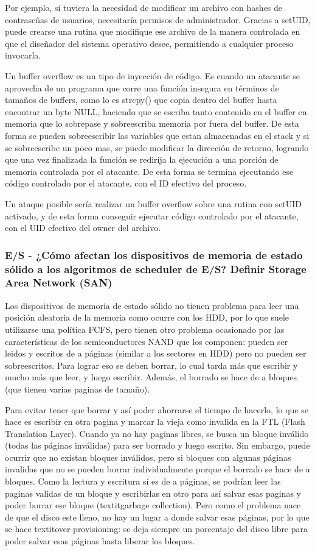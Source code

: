 Por ejemplo, si tuviera la necesidad de modificar un archivo con hashes de contraseñas de usuarios, necesitaría permisos de administrador. Gracias a setUID, puede crearse una rutina que modifique ese archivo de la manera controlada en que el diseñador del sistema operativo desee, permitiendo a cualquier proceso invocarla.

Un buffer overflow es un tipo de inyección de código. Es cuando un atacante se aprovecha de un programa que corre una función insegura en términos de tamaños de buffers, como lo es strcpy() que copia dentro del buffer hasta encontrar un byte NULL, haciendo que se escriba tanto contenido en el buffer en memoria que lo sobrepase y sobreescriba memoria por fuera del buffer. De esta forma se pueden sobreescribir las variables que estan almacenadas en el stack y si se sobreescribe un poco mas, se puede modificar la dirección de retorno, logrando que una vez finalizada la función se redirija la ejecución a una porción de memoria controlada por el atacante. De esta forma se termina ejecutando ese código controlado por el atacante, con el ID efectivo del proceso.

Un ataque posible sería realizar un buffer overflow sobre una rutina con setUID activado, y de esta forma conseguir ejecutar código controlado por el atacante, con el UID efectivo del owner del archivo.

\subsubsection{E/S - ¿Cómo afectan los dispositivos de memoria de estado sólido a los algoritmos de scheduler de E/S? Definir Storage Area Network (SAN)}

Los dispositivos de memoria de estado sólido no tienen problema para leer una posición aleatoria de la memoria como ocurre con los HDD, por lo que suele utilizarse una política FCFS, pero tienen otro problema ocasionado por las características de los semiconductores NAND que los componen: pueden ser leidos y escritos de a páginas (similar a los sectores en HDD) pero no pueden ser sobreescritos. Para lograr eso se deben borrar, lo cual tarda más que escribir y mucho más que leer, y luego escribir. Además, el borrado se hace de a bloques (que tienen varias paginas de tamaño).

Para evitar tener que borrar y así poder ahorrarse el tiempo de hacerlo, lo que se hace es escribir en otra pagina y marcar la vieja como invalida en la FTL (Flash Translation Layer). Cuando ya no hay paginas libres, se busca un bloque inválido (todas las páginas inválidas) para ser borrado y luego escrito. Sin embargo, puede ocurrir que no existan bloques inválidos, pero si bloques con algunas páginas invalidas que no se pueden borrar individualmente porque el borrado se hace de a bloques. Como la lectura y escritura sí es de a páginas, se podrían leer las paginas validas de un bloque y escribirlas en otro para así salvar esas paginas y poder borrar ese bloque (textit{garbage collection}). Pero como el problema nace de que el disco este lleno, no hay un lugar a donde salvar esas páginas, por lo que se hace textit{over-provisioning}: se deja siempre un porcentaje del disco libre para poder salvar esas páginas hasta liberar los bloques.

